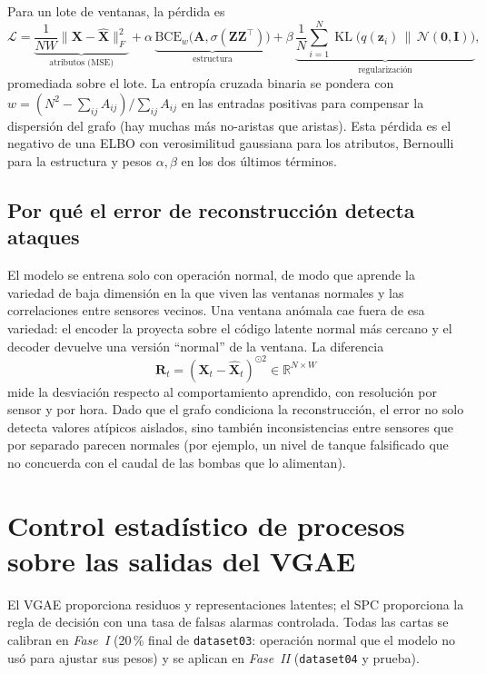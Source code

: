 \documentclass[11pt,a4paper]{article}
\newcommand{\R}{\mathbb{R}}
\newcommand{\A}{\mathbf{A}}
\newcommand{\X}{\mathbf{X}}
\newcommand{\Z}{\mathbf{Z}}
\DeclareMathOperator{\KL}{KL}
\begin{document}
Para un lote de ventanas, la pérdida es
\begin{equation}
\mathcal{L} =
\underbrace{\frac{1}{NW}\big\|\X-\hat{\X}\big\|_F^2}_{\text{atributos (MSE)}}
+\alpha\,\underbrace{\mathrm{BCE}_{w}\big(\A,\sigma(\Z\Z^\top)\big)}_{\text{estructura}}
+\beta\,\underbrace{\frac1N\sum_{i=1}^{N}\KL\big(q(\mathbf{z}_i)\,\|\,\mathcal{N}(\mathbf{0},\mathbf{I})\big)}_{\text{regularización}},
\label{eq:loss}
\end{equation}
promediada sobre el lote. La entropía cruzada binaria se pondera con
$w=(N^2-\sum_{ij}A_{ij})/\sum_{ij}A_{ij}$ en las entradas positivas para compensar la
dispersión del grafo (hay muchas más no-aristas que aristas). Esta pérdida es el
negativo de una ELBO con verosimilitud gaussiana para los atributos, Bernoulli para
la estructura y pesos $\alpha,\beta$ en los dos últimos términos.

\subsection{Por qué el error de reconstrucción detecta ataques}

El modelo se entrena solo con operación normal, de modo que aprende la variedad de
baja dimensión en la que viven las ventanas normales y las correlaciones entre
sensores vecinos. Una ventana anómala cae fuera de esa variedad: el encoder la
proyecta sobre el código latente normal más cercano y el decoder devuelve una
versión ``normal'' de la ventana. La diferencia
\begin{equation}
\mathbf{R}_t = (\X_t-\hat{\X}_t)^{\odot 2}\in\R^{N\times W}
\end{equation}
mide la desviación respecto al comportamiento aprendido, con resolución por sensor y
por hora. Dado que el grafo condiciona la reconstrucción, el error no solo detecta
valores atípicos aislados, sino también inconsistencias entre sensores que por
separado parecen normales (por ejemplo, un nivel de tanque falsificado que no
concuerda con el caudal de las bombas que lo alimentan).

\section{Control estadístico de procesos sobre las salidas del VGAE}

El VGAE proporciona residuos y representaciones latentes; el SPC proporciona la regla
de decisión con una tasa de falsas alarmas controlada. Todas las cartas se calibran en
\emph{Fase~I} (20\,\% final de \texttt{dataset03}: operación normal que el modelo no
usó para ajustar sus pesos) y se aplican en \emph{Fase~II} (\texttt{dataset04} y
prueba).
\end{document}
